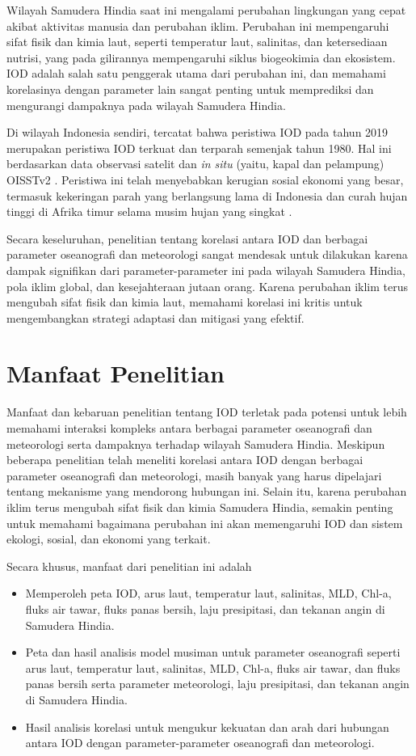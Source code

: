 \begin{spacing}{1.5}
	Wilayah Samudera Hindia saat ini mengalami perubahan lingkungan yang cepat akibat aktivitas manusia dan perubahan iklim. Perubahan ini mempengaruhi sifat fisik dan kimia laut, seperti temperatur laut, salinitas, dan ketersediaan nutrisi, yang pada gilirannya mempengaruhi siklus biogeokimia dan ekosistem. IOD adalah salah satu penggerak utama dari perubahan ini, dan memahami korelasinya dengan parameter lain sangat penting untuk memprediksi dan mengurangi dampaknya pada wilayah Samudera Hindia.

	Di wilayah Indonesia sendiri, tercatat bahwa peristiwa IOD pada tahun 2019 merupakan peristiwa IOD terkuat dan terparah semenjak tahun 1980. Hal ini berdasarkan data observasi satelit dan \textit{in situ} (yaitu, kapal dan pelampung) OISSTv2 \cite{Reynolds2002}. Peristiwa ini telah menyebabkan kerugian sosial ekonomi yang besar, termasuk kekeringan parah yang berlangsung lama di Indonesia dan curah hujan tinggi di Afrika timur selama musim hujan yang singkat \cite{Bo2020}.
	
	Secara keseluruhan, penelitian tentang korelasi antara IOD dan berbagai parameter oseanografi dan meteorologi sangat mendesak untuk dilakukan karena dampak signifikan dari parameter-parameter ini pada wilayah Samudera Hindia, pola iklim global, dan kesejahteraan jutaan orang. Karena perubahan iklim terus mengubah sifat fisik dan kimia laut, memahami korelasi ini kritis untuk mengembangkan strategi adaptasi dan mitigasi yang efektif.
	\section[Manfaat Penelitian]{Manfaat Penelitian}
	
	Manfaat dan kebaruan penelitian tentang IOD terletak pada potensi untuk lebih memahami interaksi kompleks antara berbagai parameter oseanografi dan meteorologi serta dampaknya terhadap wilayah Samudera Hindia. Meskipun beberapa penelitian telah meneliti korelasi antara IOD dengan berbagai parameter oseanografi dan meteorologi, masih banyak yang harus dipelajari tentang mekanisme yang mendorong hubungan ini.
	Selain itu, karena perubahan iklim terus mengubah sifat fisik dan kimia Samudera Hindia, semakin penting untuk memahami bagaimana perubahan ini akan memengaruhi IOD dan sistem ekologi, sosial, dan ekonomi yang terkait. 
	
	Secara khusus, manfaat dari penelitian ini adalah
	\begin{itemize}
		\item Memperoleh peta IOD, arus laut, temperatur laut, salinitas, MLD, Chl-a, fluks air tawar, fluks panas bersih, laju presipitasi, dan tekanan angin di Samudera Hindia.
		\item Peta dan hasil analisis model musiman untuk parameter oseanografi seperti arus laut, temperatur laut, salinitas, MLD, Chl-a, fluks air tawar, dan fluks panas bersih serta parameter meteorologi, laju presipitasi, dan tekanan angin di Samudera Hindia.
		\item Hasil analisis korelasi untuk mengukur kekuatan dan arah dari hubungan antara IOD dengan parameter-parameter oseanografi dan meteorologi.
	\end{itemize}
	

\end{spacing}
